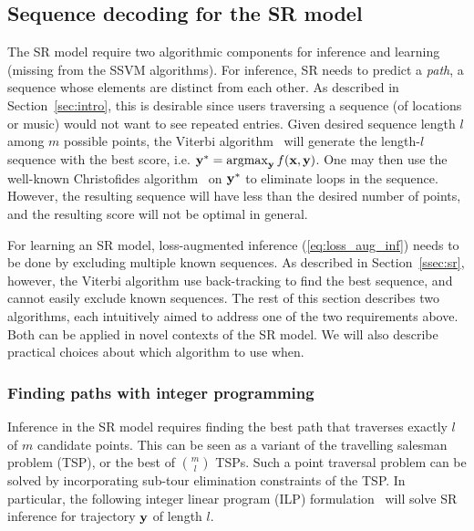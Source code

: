 
\subsection{Sequence decoding for the SR model}
\label{ssec:subtour}

The SR model require two algorithmic components for inference and learning
(missing from the SSVM algorithms).
For inference, SR needs to predict a {\em path}, \ie a sequence whose elements are distinct from each other.
As described in Section~\ref{sec:intro}, this is desirable since users traversing a sequence (of locations or music)
would not want to see repeated entries.
Given desired sequence length $l$ among $m$ possible points, the Viterbi algorithm~\cite{tsochantaridis2005large}
will generate the length-$l$ sequence with the best score, i.e. $\mathbf{y}^* = \operatorname*{argmax}_{\mathbf{y}} f(\mathbf{x},\mathbf{y})$.
One may then use the well-known
Christofides algorithm~\cite{christofides1976} on $\mathbf{y}^*$ to eliminate loops in the sequence.
However, the resulting sequence will have less than the desired number of points, and the resulting score will not be optimal in general.

For learning an SR model, loss-augmented inference (\ref{eq:loss_aug_inf}) needs to be done by excluding multiple known sequences.
As described in Section~\ref{ssec:sr}, %
however, the Viterbi algorithm use back-tracking to find the best sequence,
and cannot easily exclude known sequences.
The rest of this section describes two algorithms, each intuitively aimed to address one of the two requirements above.
Both can be applied in novel contexts of the SR model.
We will also describe practical choices about which algorithm to use when.


\subsubsection{Finding paths with integer programming}
Inference in the SR model requires finding the best path that traverses exactly $l$ of $m$ candidate points.
This can be seen as a variant of the travelling salesman problem (TSP), or the best of ${m \choose l}$ TSPs.
Such a point traversal problem can be solved by incorporating
sub-tour elimination constraints of the TSP.
In particular, the following integer linear program (ILP) formulation~\cite{ijcai15,cikm16paper}
will solve SR inference for trajectory $\mathbf{y}$ of length $l$.


